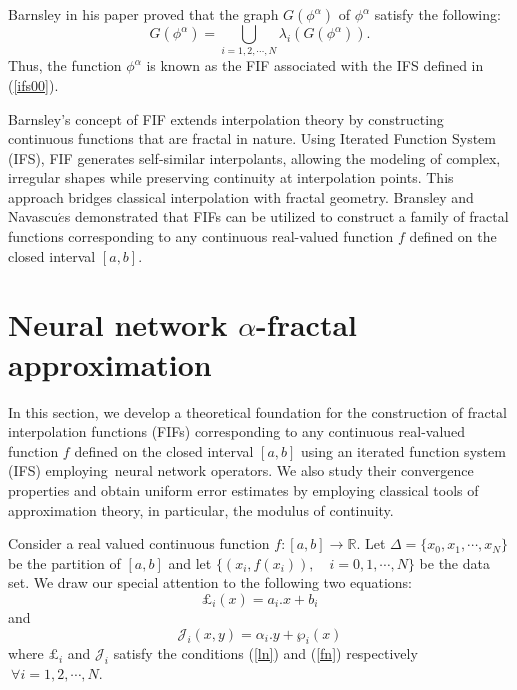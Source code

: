 \documentclass{article}[12pt, a4]
\begin{document}
	
	Barnsley in his paper \cite{barnsley1986fractal} proved that the graph \(G(\phi^{\alpha})\) of \(\phi^{\alpha}\) satisfy the following:
	\begin{equation*}
		G\left(\phi^{\alpha}\right)=\bigcup_{i =1,2,\cdots,N} \lambda_{i}\left(G\left(\phi^{\alpha}\right)\right).
	\end{equation*}
	Thus, the function \(\phi^{\alpha}\) is known as the FIF associated with the IFS defined in (\ref{ifs00}).
	
	Barnsley's \cite{barnsley1986fractal} concept of FIF extends interpolation theory by constructing continuous functions that are fractal in nature. Using Iterated Function System (IFS), FIF generates self-similar interpolants, allowing the modeling of complex, irregular shapes while preserving continuity at interpolation points. This approach bridges classical interpolation with fractal geometry. Bransley \cite{barnsley1986fractal} and Navascu$\acute{e}$s \cite{Navascues2005} demonstrated that FIFs can be utilized to construct a family of fractal functions corresponding to any continuous real-valued function \(f\) defined on the closed interval \([a, b]\).
	

	
	\section{Neural network $\alpha$-fractal approximation}\label{sec3}
	In this section, we develop a theoretical foundation for the construction of fractal interpolation functions (FIFs) corresponding to any continuous real-valued function \(f\) defined on the closed interval $[a, b]$ using an iterated function system (IFS) employing neural network operators. We also study their convergence properties and obtain uniform error estimates by employing classical tools of approximation theory, in particular, the modulus of continuity.
	
	Consider a real valued continuous function $f:[a,b]\rightarrow \mathbb{R}$. Let $\Delta =\{x_0, x_1, \cdots, x_N\} $ be the partition of $[a,b]$ and let $\{(x_i, f(x_i)), \quad i=0,1, \cdots, N\}$ be the data set.
	We draw our special attention to the following two equations:
	\begin{equation}\label{l2}
		\pounds_i(x)= a_i.x +b_i
	\end{equation}
	and 
	\begin{equation}\label{f2}
		\mathcal{J}_i(x,y)=\alpha_{i}.y+\wp_{i}(x)
	\end{equation}
	where $\pounds_i$ and $\mathcal{J}_i$ satisfy the conditions (\ref{ln}) and (\ref{fn}) respectively $\ \forall i=1,2,\cdots,N$.\\
	
\end{document}

